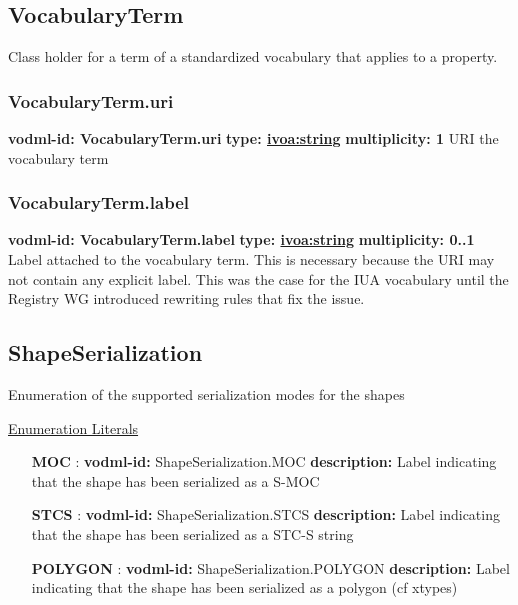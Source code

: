   \subsection{VocabularyTerm}
  \label{sect:VocabularyTerm}
    Class holder for a term of a standardized vocabulary that applies to a property.

    \subsubsection{VocabularyTerm.uri}
      \textbf{vodml-id: VocabularyTerm.uri} \newline
      \textbf{type: \hyperref[sect:ivoa]{ivoa:string}} \newline
      \textbf{multiplicity: 1} \newline
      URI the vocabulary term

    \subsubsection{VocabularyTerm.label}
      \textbf{vodml-id: VocabularyTerm.label} \newline
      \textbf{type: \hyperref[sect:ivoa]{ivoa:string}} \newline
      \textbf{multiplicity: 0..1} \newline
      Label attached to the vocabulary term. This is necessary because the URI may not contain any explicit label. This was the case for the IUA vocabulary until the Registry WG introduced rewriting rules that fix the issue.

  \subsection{ShapeSerialization}
  \label{sect:ShapeSerialization}

  Enumeration of the supported serialization modes for the shapes

  \noindent \underline{Enumeration Literals}
  \vspace{-\parsep}
  \small
  \begin{itemize}
  
    \item[\textbf{MOC}]: \textbf{vodml-id:} ShapeSerialization.MOC \newline
          \textbf{description:} Label indicating that the shape has been serialized as a S-MOC
    \item[\textbf{STCS}]: \textbf{vodml-id:} ShapeSerialization.STCS \newline
          \textbf{description:} Label indicating that the shape has been serialized as a STC-S \citep{2007ivoa.spec.1030R} string
    \item[\textbf{POLYGON}]: \textbf{vodml-id:} ShapeSerialization.POLYGON \newline
          \textbf{description:} Label indicating that the shape has been serialized as a polygon (cf xtypes)
  \end{itemize}
  \normalsize


